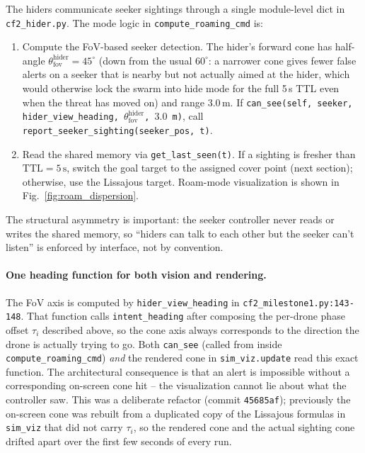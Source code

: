 \documentclass[11pt,a4paper]{article}
\newcommand{\code}[1]{\texttt{#1}}
\begin{document}
The hiders communicate seeker sightings through a single module-level dict in
\code{cf2\_hider.py}. The mode logic in \code{compute\_roaming\_cmd} is:
\begin{enumerate}[leftmargin=1.4em]
  \item Compute the FoV-based seeker detection. The hider's forward cone
        has half-angle
        $\theta_\mathrm{fov}^\mathrm{hider} = 45^\circ$ (down from the
        usual $60^\circ$: a narrower cone gives fewer false alerts on a
        seeker that is nearby but not actually aimed at the hider, which
        would otherwise lock the swarm into hide mode for the full 5\,s TTL
        even when the threat has moved on) and range $3.0$\,m. If
        \code{can\_see(self, seeker, hider\_view\_heading,
        $\theta_\mathrm{fov}^\mathrm{hider}$, $3.0$\,m)}, call
        \code{report\_seeker\_sighting(seeker\_pos, t)}.
  \item Read the shared memory via \code{get\_last\_seen(t)}. If a sighting
        is fresher than $\text{TTL} = 5\,\text{s}$, switch the goal target
        to the assigned cover point (next section); otherwise, use the
        Lissajous target. Roam-mode visualization is shown in
        Fig.~\ref{fig:roam_dispersion}.
\end{enumerate}
The structural asymmetry is important: the seeker controller never reads or
writes the shared memory, so ``hiders can talk to each other but the seeker
can't listen'' is enforced by interface, not by convention.

\paragraph{One heading function for both vision and rendering.}
The FoV axis is computed by \code{hider\_view\_heading} in
\code{cf2\_milestone1.py:143-148}. That function calls
\code{intent\_heading} after composing the per-drone phase offset
$\tau_i$ described above, so the cone axis always corresponds to the
direction the drone is actually trying to go. Both \code{can\_see} (called
from inside \code{compute\_roaming\_cmd}) \emph{and} the rendered cone in
\code{sim\_viz.update} read this exact function. The architectural
consequence is that an alert is impossible without a corresponding
on-screen cone hit -- the visualization cannot lie about what the controller
saw. This was a deliberate refactor (commit \code{45685af}); previously the
on-screen cone was rebuilt from a duplicated copy of the Lissajous
formulas in \code{sim\_viz} that did not carry $\tau_i$, so the rendered
cone and the actual sighting cone drifted apart over the first few seconds
of every run.
\end{document}
